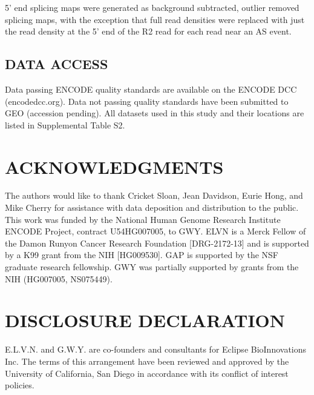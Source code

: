 5’ end splicing maps were generated as background subtracted, outlier removed splicing maps, with the exception that full read densities were replaced with just the read density at the 5’ end of the R2 read for each read near an AS event.

\subsection{DATA ACCESS}
Data passing ENCODE quality standards are available on the ENCODE DCC (encodedcc.org).  Data not passing quality standards have been submitted to GEO (accession pending).  All datasets used in this study and their locations are listed in Supplemental Table S2.

\section{ACKNOWLEDGMENTS}
The authors would like to thank Cricket Sloan, Jean Davidson, Eurie Hong, and Mike Cherry for assistance with data deposition and distribution to the public. This work was funded by the National Human Genome Research Institute ENCODE Project, contract U54HG007005, to GWY. ELVN is a Merck Fellow of the Damon Runyon Cancer Research Foundation [DRG-2172-13] and is supported by a K99 grant from the NIH [HG009530]. GAP is supported by the NSF graduate research fellowship. GWY was partially supported by grants from the NIH (HG007005, NS075449).

\section{DISCLOSURE DECLARATION}
E.L.V.N. and G.W.Y. are co-founders and consultants for Eclipse BioInnovations Inc. The terms of this arrangement have been reviewed and approved by the University of California, San Diego in accordance with its conflict of interest policies.
